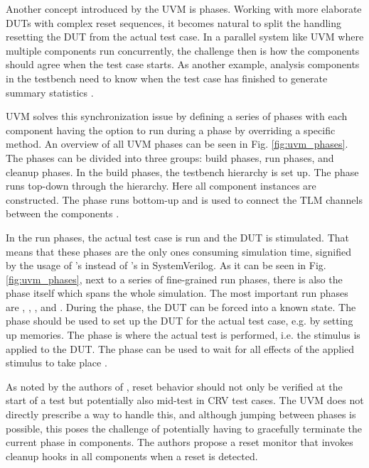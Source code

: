 Another concept introduced by the UVM is phases. Working with more elaborate DUTs with complex reset sequences, it
becomes natural to split the handling resetting the DUT from the actual test case. In a parallel system like UVM
where multiple components run concurrently, the challenge then is how the components should agree when the test case
starts. As another example, analysis components in the testbench need to know when the test case has finished to generate summary statistics \cite[ch. 4.6]{mehta2018asic}.

UVM solves this synchronization issue by defining a series of phases with each component having the option to run during
a phase by overriding a specific method. An overview of all UVM phases can be seen in Fig. \ref{fig:uvm_phases}. The
phases can be divided into three groups: build phases, run phases, and cleanup phases. In the build phases, the
testbench hierarchy is set up. The  phase runs top-down through the hierarchy. Here all component
instances are constructed. The  phase runs bottom-up and is used to connect the TLM channels between the components
\cite[ch. 4.6]{mehta2018asic}.

In the run phases, the actual test case is run and the DUT is stimulated. That means that these phases are the only
ones consuming simulation time, signified by the usage of 's instead of 's in SystemVerilog.
As it can be seen in Fig. \ref{fig:uvm_phases}, next to a series of fine-grained run phases, there is also the
 phase itself which spans the whole simulation. The most important run phases are ,
, , and . During the  phase, the DUT can be forced into a known
state. The  phase should be used to set up the DUT for the actual test case, e.g. by setting up
memories. The  phase is where the actual test is performed, i.e. the stimulus is applied to the DUT. The
 phase can be used to wait for all effects of the applied stimulus to take place \cite[ch. 4.6]{mehta2018asic}.

As noted by the authors of \cite{dvcon2014reset}, reset behavior should not only be verified at the start of a test
but potentially also mid-test in CRV test cases. The UVM does not directly prescribe a way to handle this, and although
jumping between phases is possible, this poses the challenge of potentially having to gracefully terminate the current phase in
components. The authors propose a reset monitor that invokes cleanup hooks in all components when a reset is detected.

